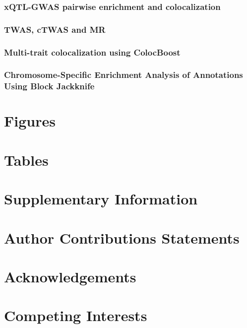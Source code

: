 \documentclass[12pt]{article}
\begin{document}
\subsubsection*{xQTL-GWAS pairwise enrichment and colocalization}

\subsubsection*{TWAS, cTWAS and MR}


\subsubsection*{Multi-trait colocalization using ColocBoost}

\subsubsection*{Chromosome-Specific Enrichment Analysis of Annotations Using Block Jackknife}


\section*{Figures}





\section*{Tables}





\section*{Supplementary Information}





\section*{Author Contributions Statements}




\section*{Acknowledgements}




\section*{Competing Interests}
\end{document}
